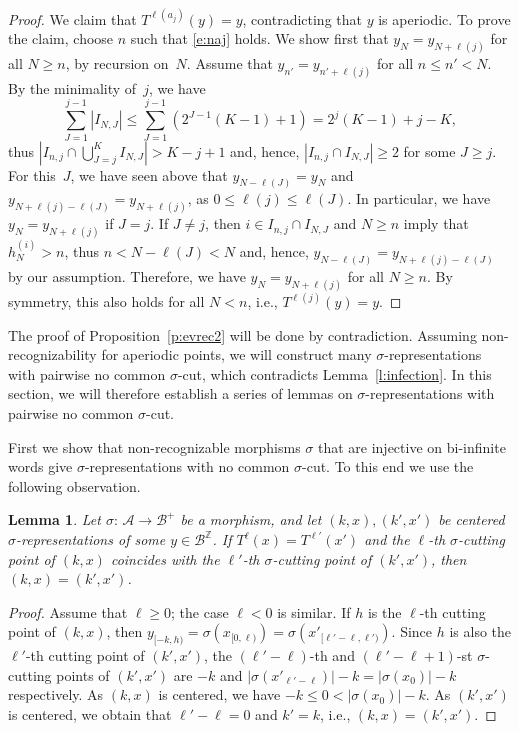 \documentclass{amsart}
\newtheorem{lemma}{Lemma}[section]
\theoremstyle{definition}
\theoremstyle{remark}
\numberwithin{equation}{section}
\begin{document}
\begin{proof}
We claim that $T^{\ell(a_j)}(y) = y$, contradicting that $y$ is aperiodic.  
To prove the claim, choose $n$ such that \eqref{e:naj} holds.
We show first that $y_{N} = y_{N+\ell(j)}$ for all $N \ge n$, by recursion on~$N$.
Assume that $y_{n'} = y_{n'+\ell(j)}$ for all $n \le n' < N$.
By the minimality of~$j$, we have
\[
\sum_{J=1}^{j-1} |I_{N,J}| \le \sum_{J=1}^{j-1} (2^{J-1} (K-1) + 1) = 2^j (K-1) +j-K,
\]
thus $|I_{n,j} \cap \bigcup_{J=j}^K I_{N,J}| > K-j+1$ and, hence, $|I_{n,j} \cap I_{N,J}| \ge 2$ for some $J \ge j$. 
For this~$J$, we have seen above that $y_{N-\ell(J)} = y_N$ and $y_{N+\ell(j)-\ell(J)} = y_{N+\ell(j)}$, as $0 \le \ell(j) \le \ell(J)$. 
In particular, we have $y_N = y_{N+\ell(j)}$ if $J = j$. 
If $J \ne j$, then $i \in I_{n,j} \cap I_{N,J}$ and $N \ge n$ imply that $h_N^{(i)} > n$, thus $n < N-\ell(J) < N$ and, hence, $y_{N-\ell(J)} = y_{N+\ell(j)-\ell(J)}$ by our assumption.
Therefore, we have $y_N = y_{N+\ell(j)}$ for all $N \ge n$.
By symmetry, this also holds for all $N < n$, i.e., $T^{\ell(j)}(y) = y$. 
\end{proof}

The proof of Proposition~\ref{p:evrec2} will be done by contradiction. 
Assuming non-recognizability for aperiodic points, we will construct many $\sigma$-representations with pairwise no common $\sigma$-cut, which contradicts Lemma~\ref{l:infection}. 
In this section, we will therefore establish a series of lemmas on $\sigma$-representations with pairwise no common $\sigma$-cut.

First we show that non-recognizable morphisms $\sigma$ that are injective on bi-infinite words give $\sigma$-representations with no common $\sigma$-cut.
To this end we use the following observation. 

\begin{lemma} \label{l:cuty}
Let $\sigma:\, \mathcal{A} \to \mathcal{B}^+$ be a morphism,  and let $(k,x), (k',x')$ be centered $\sigma$-representations of some $y \in \mathcal{B}^\mathbb{Z}$.
If $T^\ell(x) = T^{\ell'}(x')$ and the $\ell$-th $\sigma$-cutting point of $(k,x)$ coincides with the $\ell'$-th $\sigma$-cutting point of $(k',x')$, then $(k,x) = (k',x')$. 
\end{lemma}

\begin{proof}
Assume that $\ell \ge 0$; the case $\ell < 0$ is similar. 
If $h$ is the $\ell$-th cutting point of $(k,x)$, then $y_{[-k,h)} = \sigma(x_{[0,\ell)}) = \sigma(x'_{[\ell'-\ell,\ell')})$. 
Since $h$ is also the $\ell'$-th cutting point of $(k',x')$, the $(\ell'{-}\ell)$-th and $(\ell'{-}\ell+1)$-st $\sigma$-cutting points of $(k',x')$ are $-k$ and $|\sigma(x'_{\ell'-\ell})|-k = |\sigma(x_0)|-k$ respectively.
As $(k,x)$ is centered, we have $-k \le 0 < |\sigma(x_0)|-k$.
As $(k',x')$ is centered, we obtain that $\ell' - \ell = 0$ and $k' = k$, i.e., $(k,x) = (k',x')$. 
\end{proof}
\end{document}
